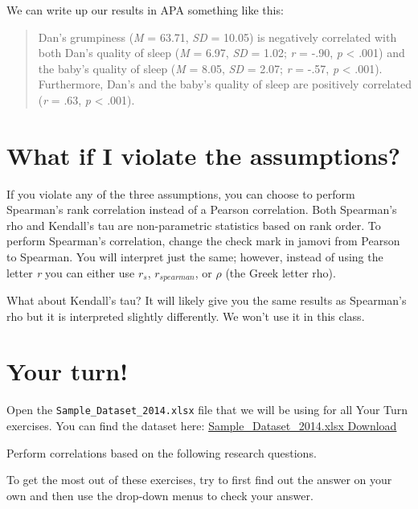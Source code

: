 \documentclass[
]{book}
\begin{document}
We can write up our results in APA something like this:

\begin{quote}
Dan's grumpiness (\emph{M} = 63.71, \emph{SD} = 10.05) is negatively correlated with both Dan's quality of sleep (\emph{M} = 6.97, \emph{SD} = 1.02; \emph{r} = -.90, \emph{p} \textless{} .001) and the baby's quality of sleep (\emph{M} = 8.05, \emph{SD} = 2.07; \emph{r} = -.57, \emph{p} \textless{} .001). Furthermore, Dan's and the baby's quality of sleep are positively correlated (\emph{r} = .63, \emph{p} \textless{} .001).
\end{quote}

\hypertarget{what-if-i-violate-the-assumptions}{%
\section{What if I violate the assumptions?}\label{what-if-i-violate-the-assumptions}}

If you violate any of the three assumptions, you can choose to perform Spearman's rank correlation instead of a Pearson correlation. Both Spearman's rho and Kendall's tau are non-parametric statistics based on rank order. To perform Spearman's correlation, change the check mark in jamovi from Pearson to Spearman. You will interpret just the same; however, instead of using the letter \emph{r} you can either use \(r_s\), \(r_{spearman}\), or \(\rho\) (the Greek letter rho).

What about Kendall's tau? It will likely give you the same results as Spearman's rho but it is interpreted slightly differently. We won't use it in this class.

\hypertarget{your-turn-4}{%
\section{Your turn!}\label{your-turn-4}}

Open the \texttt{Sample\_Dataset\_2014.xlsx} file that we will be using for all Your Turn exercises. You can find the dataset here: \href{https://github.com/danawanzer/stats-with-jamovi/blob/master/data/Sample_Dataset_2014.xlsx}{Sample\_Dataset\_2014.xlsx Download}

Perform correlations based on the following research questions.

To get the most out of these exercises, try to first find out the answer on your own and then use the drop-down menus to check your answer.
\end{document}
